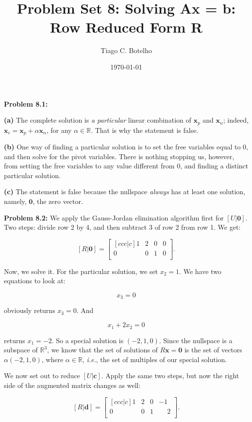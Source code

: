 \documentclass{article}
\title{Problem Set 8: Solving Ax = b: Row Reduced Form R}
\author{Tiago C. Botelho}
\date{\today}
\begin{document}
\maketitle

\noindent \textbf{Problem 8.1:}

\noindent \textbf{(a)} The complete solution is \textit{a particular} linear combination of $\mathbf{x}_p$ and $\mathbf{x}_n$; indeed, $\mathbf{x}_c = \mathbf{x}_p + \alpha \mathbf{x}_n$, for any $\alpha \in \mathbb{R}$. That is why the statement is false.

\noindent \textbf{(b)} One way of finding a particular solution is to set the free variables equal to 0, and then solve for the pivot variables. There is nothing stopping us, however, from setting the free variables to any value different from 0, and finding a distinct particular solution.

\noindent \textbf{(c)} The statement is false because the nullspace \textit{always} has at least one solution, namely, $\mathbf{0}$, the zero vector.

\noindent \textbf{Problem 8.2:} We apply the Gauss-Jordan elimination algorithm first for $[U | \mathbf{0}]$. Two steps: divide row 2 by 4, and then subtract 3 of row 2 from row 1. We get:


\[
[R | \mathbf{0}] = \begin{bmatrix}[ccc|c]
1 & 2 & 0 & 0\\
0 & 0 & 1 & 0\\
\end{bmatrix}.
\]

Now, we solve it. For the particular solution, we set $x_2 = 1$. We have two equations to look at:

\[
x_3 = 0
\]

obviously returns $x_3 = 0$. And

\[
x_1 + 2x_2 = 0
\]

returns $x_1 = -2$. So a special solution is $(-2, 1, 0)$. Since the nullspace is a subspace of $\mathbb{R}^{3}$, we know that the set of solutions of $R\mathbf{x = 0}$ is the set of vectors $\alpha (-2, 1, 0)$, where $\alpha \in \mathbb{R}$, \textit{i.e.}, the set of multiples of our special solution.

We now set out to reduce $[U|\mathbf{c}]$. Apply the same two steps, but now the right side of the augmented matrix changes as well:

\[
[R|\mathbf{d}] = \begin{bmatrix}[ccc|c]
1 & 2 & 0 & -1\\
0 & 0 & 1 & \phantom{-}2\\
\end{bmatrix}.
\]
\end{document}
